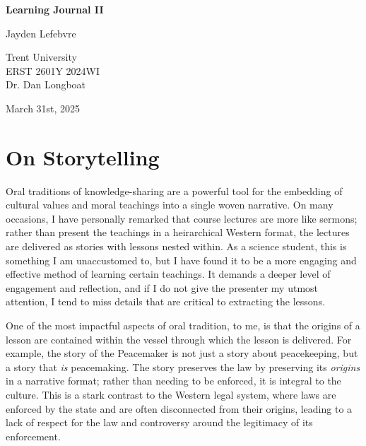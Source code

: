\documentclass{report}
\begin{document}
\begin{titlepage}
    \begin{center}
        \vspace*{1.2cm}

        \textbf{Learning Journal II}

        \vspace{2cm}

        Jayden Lefebvre\\

        \vspace{5cm}
        
        Trent University\\
        ERST 2601Y 2024WI\\
        Dr. Dan Longboat\\

        \vfill

        March 31st, 2025
        
    \end{center}
\end{titlepage}

\thispagestyle{plain}
\tableofcontents

\clearpage

\section{On Storytelling}

\hspace{24pt} Oral traditions of knowledge-sharing are a powerful tool for the embedding of cultural values and moral teachings into a single woven narrative. On many occasions, I have personally remarked that course lectures are more like sermons; rather than present the teachings in a heirarchical Western format, the lectures are delivered as stories with lessons nested within. As a science student, this is something I am unaccustomed to, but I have found it to be a more engaging and effective method of learning certain teachings. It demands a deeper level of engagement and reflection, and if I do not give the presenter my utmost attention, I tend to miss details that are critical to extracting the lessons.

\hspace{24pt} One of the most impactful aspects of oral tradition, to me, is that the origins of a lesson are contained within the vessel through which the lesson is delivered. For example, the story of the Peacemaker is not just a story about peacekeeping, but a story that \textit{is} peacemaking. The story preserves the law by preserving its \textit{origins} in a narrative format; rather than needing to be enforced, it is integral to the culture. This is a stark contrast to the Western legal system, where laws are enforced by the state and are often disconnected from their origins, leading to a lack of respect for the law and controversy around the legitimacy of its enforcement.
\end{document}
